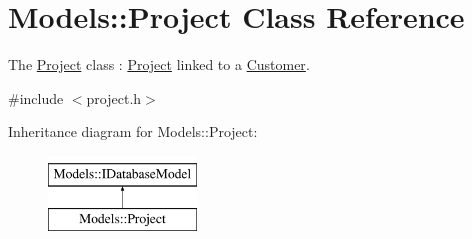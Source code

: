 \hypertarget{classModels_1_1Project}{\section{Models\+:\+:Project Class Reference}
\label{classModels_1_1Project}
}


The \hyperlink{classModels_1_1Project}{Project} class \+: \hyperlink{classModels_1_1Project}{Project} linked to a \hyperlink{classModels_1_1Customer}{Customer}.  




{\ttfamily \#include $<$project.\+h$>$}

Inheritance diagram for Models\+:\+:Project\+:\begin{figure}[H]
\begin{center}
\leavevmode
\includegraphics[height=2.000000cm]{dd/d3f/classModels_1_1Project}
\end{center}
\end{figure}

